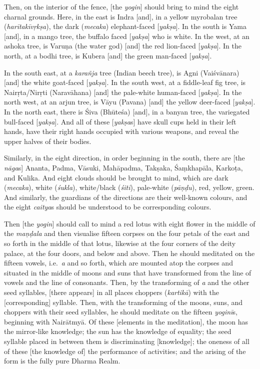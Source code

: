\documentclass[naipra.tex]{subfiles}
\begin{document}
Then, on the interior of the fence, [the \emph{yogin}] should bring to mind the eight charnal grounds.
Here, in the east is Indra [and], in a yellow myrobalan tree (\emph{harītakīvṛkṣa}), the dark (\emph{mecaka}) elephant-faced [\emph{yakṣa}].
In the south is Yama [and], in a mango tree, the buffalo faced [\emph{yakṣa}] who is white.
In the west, at an ashoka tree, is Varuṇa (the water god) [and] the red lion-faced [\emph{yakṣa}].
In the north, at a bodhi tree, is Kubera [and] the green %
man-faced [\emph{yakṣa}]. 

In the south east, at a \emph{karañja} tree (Indian beech tree), is Agni (Vaiśvānara) [and] the white goat-faced [\emph{yakṣa}]. %
In the south west, at a fiddle-leaf fig tree, is Nairṛta/Nirṛti (Naravāhana) [and] the pale-white human-faced [\emph{yakṣa}]. %
In the north west, at an arjun tree, is Vāyu (Pavana) [and] the yellow deer-faced [\emph{yakṣa}]. %
In the north east, there is Śiva (Bhūteśa) [and], in a banyan tree, the variegated bull-faced [\emph{yakṣa}]. %
And all of these [\emph{yakṣa}s] have skull cups held in their left hands, have their right hands occupied with various weapons, and reveal the upper halves of their bodies.

Similarly, in the eight direction, in order beginning in the south, there are [the \emph{nāga}s] Ananta, Padma, Vāsuki, Mahāpadma, Takṣaka, Śaṃkhapāla, Karkoṭa, and Kulika.
And eight clouds should be brought to mind, which are dark (\emph{mecaka}), white (\emph{śukla}), white/black (\emph{śiti}), pale-white (\emph{pāṇḍu}), red, yellow, green. 
And similarly, the guardians of the directions are their well-known colours, and the eight \emph{caitya}s should be understood to be corresponding colours. 

Then [the \emph{yogin}] should call to mind a red lotus with eight flower in the middle of the \emph{maṇḍala} and then visualise fifteen corpses on the four petals of the east and so forth in the middle of that lotus, likewise at the four corners of the deity palace, at the four doors, and below and above.
Then he should meditated on the fifteen vowels, i.e.\ \emph{a} and so forth, which are mounted atop the corpses and situated in the middle of moons and suns that have transformed from the line of vowels and the line of consonants.
Then, by the transforming of \emph{a} and the other seed syllables, [there appears] in all places choppers (\emph{kartikā}) with the [corresponding] syllable.
Then, with the transforming of the moons, suns, and choppers with their seed syllables, he should meditate on the fifteen \emph{yoginī}s, beginning with Nairātmyā.
Of these [elements in the meditation], the moon has the mirror-like knowledge; the sun has the knowledge of equality; the seed syllable placed in between them is discriminating [knowledge]; the oneness of all of these [the knowledge of] the performance of activities; and the arising of the form is the fully pure Dharma Realm.
\end{document}
